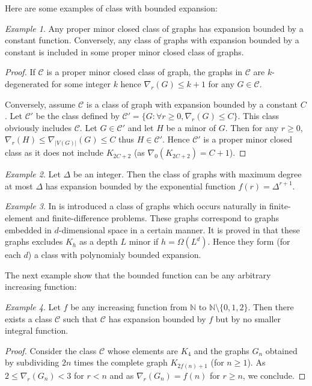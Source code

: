 \documentclass[a4paper]{amsart}
\theoremstyle{definition}
\theoremstyle{remark}
\newtheorem{example}{Example}
\newcommand{\field}[1]{\mathbb{#1}}
\newcommand{\bbbn}{\field{N}}
\newcommand{\rdens}[1]{\nabla_{#1}}
\newcommand{\card}[1]{\lvert{#1}\rvert}
\begin{document}
Here are some examples of class with bounded expansion:
\begin{example}
Any proper minor closed class of graphs has expansion bounded by a
constant function. Conversely, any class of graphs with expansion
bounded by a constant is included in some proper minor closed class of
graphs.
\end{example}
\begin{proof}
If $\mathcal C$ is a proper minor closed class of graph, the graphs in
$\mathcal C$ are $k$-degenerated for some integer $k$ hence
$\rdens{r}(G)\leq k+1$ for any $G\in\mathcal C$.

Conversely, assume $\mathcal C$ is a class of graph with expansion
bounded by a constant $C$. Let $\mathcal C'$ be the class defined by
$\mathcal C'=\{G: \forall r\geq 0, \rdens{r}(G)\leq C\}$. This class
obviously includes $\mathcal C$. Let $G\in\mathcal C'$ and let $H$ be
a minor of $G$. Then for any $r\geq 0$,
$\rdens{r}(H)\leq\rdens{\card{V(G)}}(G)\leq C$ thus $H\in\mathcal C'$. Hence
$\mathcal C'$ is a proper minor closed class as it does not include $K_{2C+2}$ (as
$\rdens{0}(K_{2C+2})=C+1$).
\end{proof}

\begin{example}
Let $\Delta$ be an integer. Then the class of graphs with maximum
degree at most $\Delta$ has expansion bounded by the exponential function
$f(r)=\Delta^{r+1}$.
\end{example}

\begin{example}
In \cite{miller98} is introduced a class of graphs which occurs
naturally in finite-element and finite-difference problems. These graphs
correspond to graphs embedded in $d$-dimensional space in a certain
manner. It is proved in \cite{teng98} that these graphs excludes $K_h$
as a depth $L$ minor if $h=\Omega(L^d)$. Hence they form (for each
$d$) a class with polynomialy bounded expansion.
\end{example}



The next example show that the bounded function can be any arbitrary
increasing function:

\begin{example}
Let $f$ be any increasing function from $\bbbn$ to $\bbbn\setminus\{0,1,2\}$.
Then there exists a class $\mathcal C$ such that $\mathcal C$ has
expansion bounded by $f$ but by no smaller integral function.
\end{example}
\begin{proof}
Consider the class $\mathcal C$ whose elements are $K_4$ and the graphs $G_n$ obtained
by subdividing $2n$ times the complete graph $K_{2f(n)+1}$ (for $n\geq 1$).
As $2\leq \rdens{r}(G_n)<3$ for $r<n$ and as $\rdens{r}(G_n)=f(n)$ for
$r\geq n$, we conclude.
\end{proof}
\end{document}

